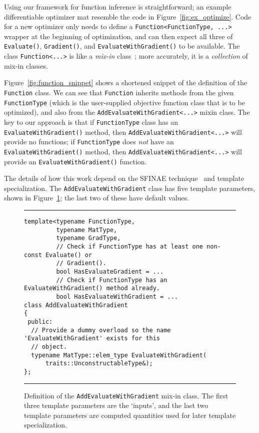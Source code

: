 Using our framework for function inference is straightforward;
an example differentiable optimizer mat resemble the code in Figure~\ref{fig:ex_optimize}.
Code for a new optimizer only needs to define a {\tt Function<FunctionType, ...>} wrapper at the
beginning of optimization, and can then expect all three of {\tt Evaluate()},
{\tt Gradient()}, and {\tt EvaluateWithGradient()} to be available.
The class {\tt Function<...>} is like a {\it mix-in} class~\cite{smaragdakis2000mixin};
more accurately, it is a {\it collection} of mix-in classes.


Figure~\ref{fig:function_snippet} shows a shortened snippet of the definition
of the {\tt Function} class.
We can see that {\tt Function} inherits methods from the given {\tt
FunctionType} (which is the user-supplied objective function class that is to be
optimized), and also from the {\tt AddEvaluateWithGradient<...>} mixin class.
The key to our approach is that if {\tt FunctionType} class has an {\tt
EvaluateWithGradient()} method, then {\tt AddEvaluateWithGradient<...>} will
provide no functions; if {\tt FunctionType} does {\em not} have an {\tt
EvaluateWithGradient()} method, then {\tt AddEvaluateWithGradient<...>} will
provide an {\tt EvaluateWithGradient()} function.

The details of how this work depend on the SFINAE technique~\cite{TODO} and
template specialization.  The {\tt AddEvaluateWithGradient} class has five
template parameters, shown in Figure~\ref{fig:aewg}; the last two of these have
default values.

\begin{figure}[b!]
\hrule
\vspace{1ex}
\begin{verbatim}
template<typename FunctionType,
         typename MatType,
         typename GradType,
         // Check if FunctionType has at least one non-const Evaluate() or
         // Gradient().
         bool HasEvaluateGradient = ...
         // Check if FunctionType has an EvaluateWithGradient() method already.
         bool HasEvaluateWithGradient = ...
class AddEvaluateWithGradient
{
 public:
  // Provide a dummy overload so the name 'EvaluateWithGradient' exists for this
  // object.
  typename MatType::elem_type EvaluateWithGradient(
      traits::UnconstructableType&);
};
\end{verbatim}
\hrule
\vspace*{-0.5em}
\caption{Definition of the {\tt AddEvaluateWithGradient} mix-in class.  The
first three template parameters are the `inputs', and the last two template
parameters are computed quantities used for later template specialization.}
\label{fig:aewg}
\end{figure}

